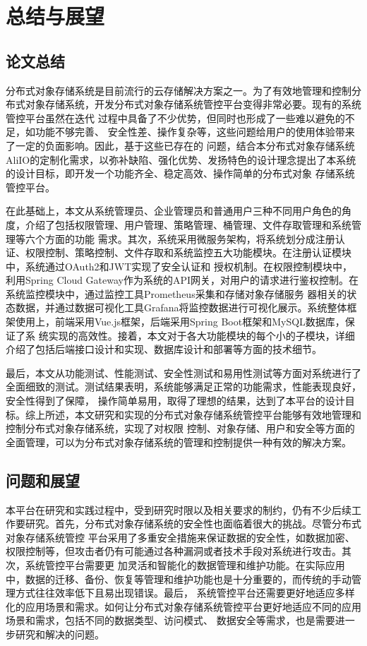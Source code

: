 \chapter{总结与展望}

\section{论文总结}


分布式对象存储系统是目前流行的云存储解决方案之一。为了有效地管理和控制分布式对象存储系统，开发分布式对象存储系统管控平台变得非常必要。现有的系统管控平台虽然在迭代
过程中具备了不少优势，但同时也形成了一些难以避免的不足，如功能不够完善、 安全性差、操作复杂等，这些问题给用户的使用体验带来了一定的负面影响。因此，基于这些已存在的
问题，结合本分布式对象存储系统AliIO的定制化需求，以弥补缺陷、强化优势、发扬特色的设计理念提出了本系统的设计目标，即开发一个功能齐全、稳定高效、操作简单的分布式对象
存储系统管控平台。

在此基础上，本文从系统管理员、企业管理员和普通用户三种不同用户角色的角度，介绍了包括权限管理、用户管理、策略管理、桶管理、文件存取管理和系统管理等六个方面的功能
需求。其次，系统采用微服务架构，将系统划分成注册认证、权限控制、策略控制、文件存取和系统监控五大功能模块。在注册认证模块中，系统通过OAuth2和JWT实现了安全认证和
授权机制。在权限控制模块中，利用Spring Cloud Gateway作为系统的API网关，对用户的请求进行鉴权控制。在系统监控模块中，通过监控工具Prometheus采集和存储对象存储服务
器相关的状态数据，并通过数据可视化工具Grafana将监控数据进行可视化展示。系统整体框架使用上，前端采用Vue.js框架，后端采用Spring Boot框架和MySQL数据库，保证了系
统实现的高效性。接着，本文对于各大功能模块的每个小的子模块，详细介绍了包括后端接口设计和实现、数据库设计和部署等方面的技术细节。

最后，本文从功能测试、性能测试、安全性测试和易用性测试等方面对系统进行了全面细致的测试。测试结果表明，系统能够满足正常的功能需求，性能表现良好，安全性得到了保障，
操作简单易用，取得了理想的结果，达到了本平台的设计目标。综上所述，本文研究和实现的分布式对象存储系统管控平台能够有效地管理和控制分布式对象存储系统，实现了对权限
控制、对象存储、用户和安全等方面的全面管理，可以为分布式对象存储系统的管理和控制提供一种有效的解决方案。




\section{问题和展望}

本平台在研究和实践过程中，受到研究时限以及相关要求的制约，仍有不少后续工作要研究。首先，分布式对象存储系统的安全性也面临着很大的挑战。尽管分布式对象存储系统管控
平台采用了多重安全措施来保证数据的安全性，如数据加密、权限控制等，但攻击者仍有可能通过各种漏洞或者技术手段对系统进行攻击。其次，系统管控平台需要更
加灵活和智能化的数据管理和维护功能。在实际应用中，数据的迁移、备份、恢复等管理和维护功能也是十分重要的，而传统的手动管理方式往往效率低下且易出现错误。最后，
系统管控平台还需要更好地适应多样化的应用场景和需求。如何让分布式对象存储系统管控平台更好地适应不同的应用场景和需求，包括不同的数据类型、访问模式、
数据安全等需求，也是需要进一步研究和解决的问题。

